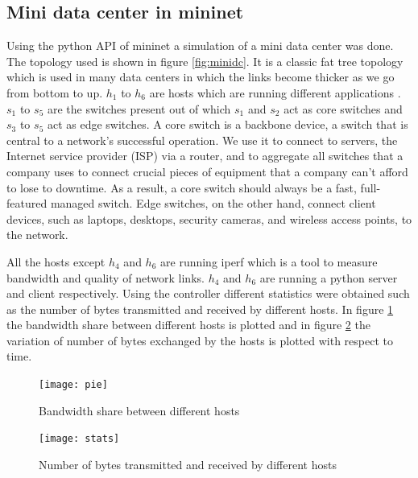\subsection{Mini data center in mininet}
Using the python API of mininet a simulation of a mini data center was done. The topology used is shown in figure \ref{fig:minidc}. It is a classic fat tree topology which is used in many data centers in which the links become thicker as we go from bottom to up. $h_1$ to $h_6$ are hosts which are running different applications . $s_1$ to $s_5$ are the switches present out of which $s_1$ and $s_2$ act as core switches and $s_3$ to $s_5$ act as edge switches. A core switch is a backbone device, a switch that is central to a network’s successful operation. We use it to connect to servers, the Internet service provider (ISP) via a router, and to aggregate all switches that a company uses to connect crucial pieces of equipment that a company can’t afford to lose to downtime. As a result, a core switch should always be a fast, full-featured managed switch. Edge switches, on the other hand, connect client devices, such as laptops, desktops, security cameras, and wireless access points, to the network.

All the hosts except $h_4$ and $h_6$ are running iperf which is a tool to measure bandwidth and quality of network links. $h_4$ and $h_6$ are running a python server and client respectively. Using the controller different statistics were obtained such as the number of bytes transmitted and received by different hosts. In figure \ref{fig:pie} the bandwidth share between different hosts is plotted and in figure \ref{fig:stats} the variation of number of bytes exchanged by the hosts is plotted with respect to time.

\begin{figure}[h]
\begin{center}	

\texttt{[image: pie]} 
\caption{Bandwidth share between different hosts}
\label{fig:pie}
\end{center}
\end{figure}

\begin{figure}[h]
\begin{center}	
\texttt{[image: stats]} 
\caption{Number of bytes transmitted and received by different hosts}
\label{fig:stats}
\end{center}
\end{figure}

\pagebreak

